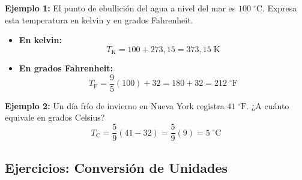 \documentclass[12pt, letterpaper]{article}
\begin{document}
\noindent\textbf{Ejemplo 1:} El punto de ebullición del agua a nivel del mar es $100\;^\circ\text{C}$. Expresa esta temperatura en kelvin y en grados Fahrenheit.
\begin{itemize}[leftmargin=*]
  \item \textbf{En kelvin:}
        $$T_{\text{K}} = 100 + 273{,}15 = 373{,}15\;\text{K}$$
  \item \textbf{En grados Fahrenheit:}
        $$T_{\text{F}} = \frac{9}{5}(100) + 32 = 180 + 32 = 212\;^\circ\text{F}$$
\end{itemize}

\noindent\textbf{Ejemplo 2:} Un día frío de invierno en Nueva York registra $41\;^\circ\text{F}$. ¿A cuánto equivale en grados Celsius?
$$T_{\text{C}} = \frac{5}{9}(41 - 32) = \frac{5}{9}(9) = 5\;^\circ\text{C}$$


\subsection{Ejercicios: Conversión de Unidades}
\end{document}
